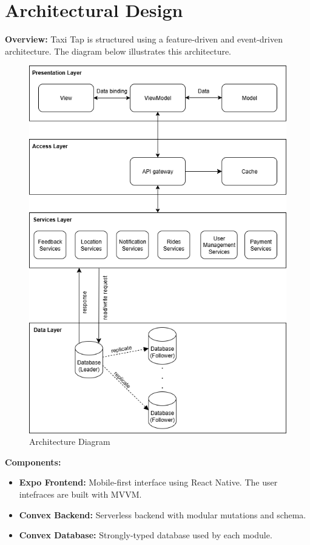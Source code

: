\documentclass[12pt]{article}
\begin{document}
\section{Architectural Design}
\textbf{Overview:} Taxi Tap is structured using a feature-driven and event-driven architecture. The diagram below illustrates this architecture.

\vspace{1em}
\begin{figure}[H]
  \centering
  \includegraphics[width=1\textwidth]{Architecural Diagram.png}
  \caption{Architecture Diagram}
\end{figure}

\textbf{Components:}

\begin{itemize}
  \item \textbf{Expo Frontend:} Mobile-first interface using React Native. The user intefraces are built with MVVM.
  \item \textbf{Convex Backend:} Serverless backend with modular mutations and schema.
  \item \textbf{Convex Database:} Strongly-typed database used by each module.
\end{itemize}
\end{document}
